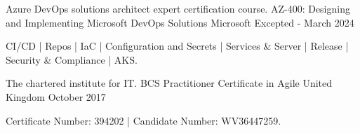 
\begin{cventries}
   \cventry
    {Azure DevOps solutions architect expert certification course.} %
    {AZ-400: Designing and Implementing Microsoft DevOps Solutions} %
    {Microsoft} %
    {Excepted - March 2024}  %
    { 
        {
        \begin{cvitems} %
          \item {CI/CD | Repos | IaC | Configuration and Secrets | Services \& Server | Release | Security \& Compliance | AKS. }
        \end{cvitems}
        }
    }
    
    \cventry
    {The chartered institute for IT.} %
    {BCS Practitioner Certificate in Agile} %
    {United Kingdom} %
    {October 2017} %
    {
        \begin{cvitems} %
          \item {Certificate Number: 394202 | Candidate Number: WV36447259.}
        \end{cvitems}
    }

\end{cventries}